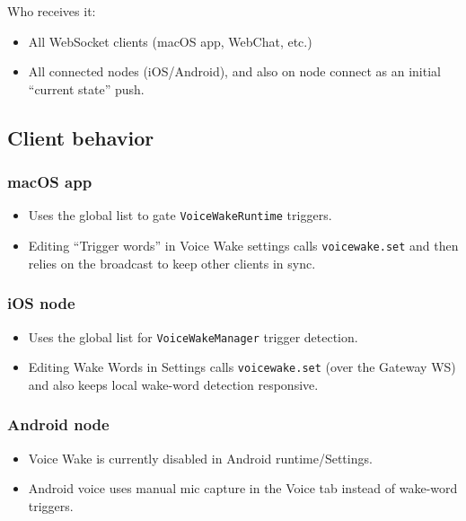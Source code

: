 Who receives it:

\begin{itemize}
  \item All WebSocket clients (macOS app, WebChat, etc.)
  \item All connected nodes (iOS/Android), and also on node connect as an initial “current state” push.
\end{itemize}


\subsection{Client behavior}


\subsubsection{macOS app}


\begin{itemize}
  \item Uses the global list to gate \texttt{VoiceWakeRuntime} triggers.
  \item Editing “Trigger words” in Voice Wake settings calls \texttt{voicewake.set} and then relies on the broadcast to keep other clients in sync.
\end{itemize}


\subsubsection{iOS node}


\begin{itemize}
  \item Uses the global list for \texttt{VoiceWakeManager} trigger detection.
  \item Editing Wake Words in Settings calls \texttt{voicewake.set} (over the Gateway WS) and also keeps local wake-word detection responsive.
\end{itemize}


\subsubsection{Android node}


\begin{itemize}
  \item Voice Wake is currently disabled in Android runtime/Settings.
  \item Android voice uses manual mic capture in the Voice tab instead of wake-word triggers.
\end{itemize}



\clearpage
